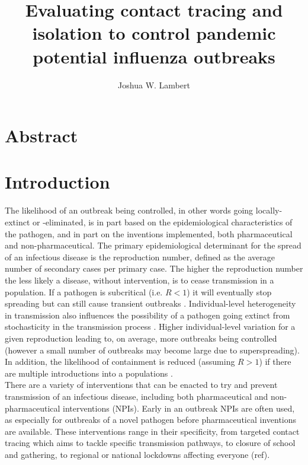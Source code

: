\documentclass{article}
\title{Evaluating contact tracing and isolation to control pandemic potential influenza outbreaks}
\author{Joshua W. Lambert}
\date{}
\begin{document}
\maketitle

\section*{Abstract}

\section*{Introduction}

The likelihood of an outbreak being controlled, in other words going locally-extinct or -eliminated, is in part based on the epidemiological characteristics of the pathogen, and in part on the inventions implemented, both pharmaceutical and non-pharmaceutical. The primary epidemiological determinant for the spread of an infectious disease is the reproduction number, defined as the average number of secondary cases  per primary case. The higher the reproduction number the less likely a disease, without intervention, is to cease transmission in a population. If a pathogen is subcritical (i.e. $R < 1$) it will eventually stop spreading but can still cause transient outbreaks \citep{farringtonDistributionTimeExtinction1999}. Individual-level heterogeneity in transmission also influences the possibility of a pathogen going extinct from stochasticity in the transmission process \citep{lloyd-smithSuperspreadingEffectIndividual2005}. Higher individual-level variation for a given reproduction leading to, on average, more outbreaks being controlled (however a small number of outbreaks may become large due to superspreading). In addition, the likelihood of containment is reduced (assuming $R > 1$) if there are multiple introductions into a populations \citep{kucharskiEarlyDynamicsTransmission2020}. \\

There are a variety of interventions that can be enacted to try and prevent transmission of an infectious disease, including both pharmaceutical and non-pharmaceutical interventions (NPIs). Early in an outbreak NPIs are often used, as especially for outbreaks of a novel pathogen before pharmaceutical inventions are available. These interventions range in their specificity, from targeted contact tracing which aims to tackle specific transmission pathways, to closure of school and gathering, to regional or national lockdowns affecting everyone (ref). \\
\end{document}
